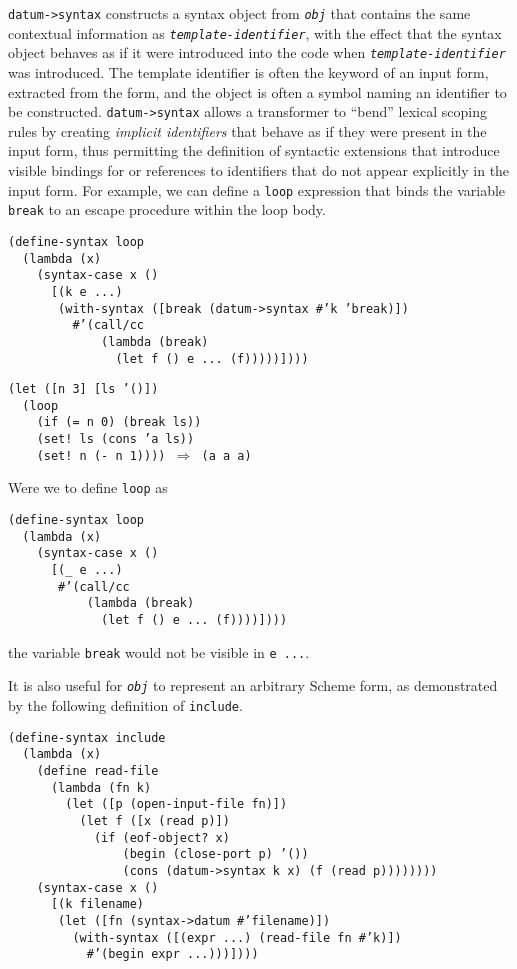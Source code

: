\texttt{datum-\textgreater{}syntax} constructs a syntax object from \texttt{\textit{obj}} that
contains the same contextual information as
\texttt{\textit{template-identifier}}, with the effect that the
syntax object behaves
as if it were introduced into the code when
\texttt{\textit{template-identifier}} was introduced.
The template identifier is often the keyword of an input form,
extracted from the form, and the object is often a symbol naming an
identifier to be constructed.
\texttt{datum-\textgreater{}syntax} allows a transformer to ``bend'' lexical
scoping rules by creating \textit{implicit identifiers}
that behave as if they were present in the input form,
thus permitting the definition of syntactic
extensions that introduce visible bindings for or references to
identifiers that do not appear explicitly in the input form.
For example, we can define a \label{syntax_s46}\texttt{loop} expression that
binds the variable \label{syntax_s47}\texttt{break} to an escape procedure
within the loop body.

\begin{alltt}
(define-syntax loop
  (lambda (x)
    (syntax-case x ()
      [(k e ...)
       (with-syntax ([break (datum-\textgreater{}syntax \#{}'k 'break)])
         \#{}'(call/cc
             (lambda (break)
               (let f () e ... (f)))))])))

(let ([n 3] [ls '()])
  (loop
    (if (= n 0) (break ls))
    (set! ls (cons 'a ls))
    (set! n (- n 1)))) \(\Rightarrow\) (a a a)
\end{alltt}


Were we to define \texttt{loop} as


\begin{alltt}
(define-syntax loop
  (lambda (x)
    (syntax-case x ()
      [(\_{} e ...)
       \#{}'(call/cc
           (lambda (break)
             (let f () e ... (f))))])))
\end{alltt}


the variable \texttt{break} would not be visible in \texttt{e ...}.


It is also useful for \texttt{\textit{obj}} to represent an arbitrary
Scheme form, as demonstrated by the following definition of
\label{syntax_s48}\texttt{include}.


\begin{alltt}
(define-syntax include
  (lambda (x)
    (define read-file
      (lambda (fn k)
        (let ([p (open-input-file fn)])
          (let f ([x (read p)])
            (if (eof-object? x)
                (begin (close-port p) '())
                (cons (datum-\textgreater{}syntax k x) (f (read p))))))))
    (syntax-case x ()
      [(k filename)
       (let ([fn (syntax-\textgreater{}datum \#{}'filename)])
         (with-syntax ([(expr ...) (read-file fn \#{}'k)])
           \#{}'(begin expr ...)))])))
\end{alltt}

